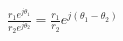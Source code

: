 $\displaystyle \frac {r_1e^{j\theta_1}}{r_2e^{j\theta_2}} = \frac{r_1}{r_2}e^{j(\theta_1-\theta_2)}$
